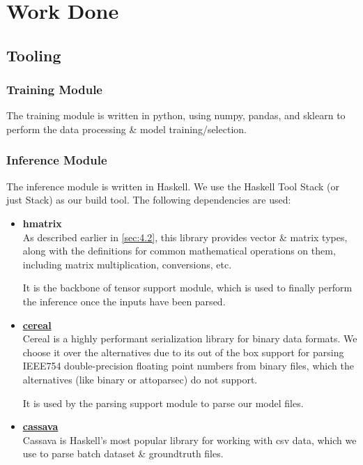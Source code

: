 \documentclass[12pt, titlepage]{article}
\begin{document}
\section{Work Done}
\subsection{Tooling}
\subsubsection{Training Module}
The training module is written in python, using numpy, pandas, and sklearn to perform the data processing \& model training/selection.\bigskip

\subsubsection{Inference Module}
The inference module is written in Haskell. We use the Haskell Tool Stack (or just Stack) as our build tool. The following dependencies are used:
\begin{itemize}
	\item \textbf{hmatrix}\\
	As described earlier in \ref{sec:4.2}, this library provides vector \& matrix types, along with the definitions for common mathematical operations on them, including matrix multiplication, conversions, etc.\bigskip

	It is the backbone of tensor support module, which is used to finally perform the inference once the inputs have been parsed.

	\item \textbf{\href{https://hackage.haskell.org/package/cereal}{cereal}}\\
	Cereal is a highly performant serialization library for binary data formats. We choose it over the alternatives due to its out of the box support for parsing IEEE754 double-precision floating point numbers from binary files, which the alternatives (like binary or attoparsec) do not support.\bigskip

	It is used by the parsing support module to parse our model files.

	\item \textbf{\href{https://hackage.haskell.org/package/cassava-0.5.3.1}{cassava}}\\
	Cassava is Haskell's most popular library for working with csv data, which we use to parse batch dataset \& groundtruth files.
\end{itemize}
\end{document}
